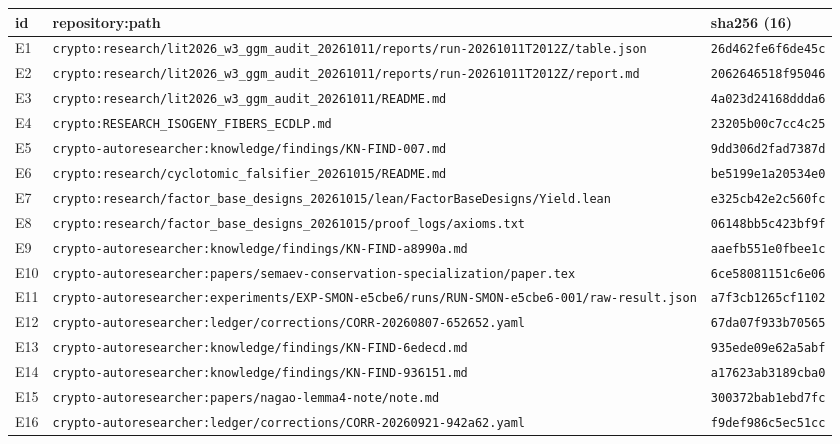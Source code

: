 \begin{longtable}{@{}l p{10.6cm} l@{}}
\toprule
id & repository:path & sha256 (16) \\
\midrule
\endhead
E1 & \nolinkurl{crypto:research/lit2026_w3_ggm_audit_20261011/reports/run-20261011T2012Z/table.json} & \texttt{26d462fe6f6de45c} \\
E2 & \nolinkurl{crypto:research/lit2026_w3_ggm_audit_20261011/reports/run-20261011T2012Z/report.md} & \texttt{2062646518f95046} \\
E3 & \nolinkurl{crypto:research/lit2026_w3_ggm_audit_20261011/README.md} & \texttt{4a023d24168ddda6} \\
E4 & \nolinkurl{crypto:RESEARCH_ISOGENY_FIBERS_ECDLP.md} & \texttt{23205b00c7cc4c25} \\
E5 & \nolinkurl{crypto-autoresearcher:knowledge/findings/KN-FIND-007.md} & \texttt{9dd306d2fad7387d} \\
E6 & \nolinkurl{crypto:research/cyclotomic_falsifier_20261015/README.md} & \texttt{be5199e1a20534e0} \\
E7 & \nolinkurl{crypto:research/factor_base_designs_20261015/lean/FactorBaseDesigns/Yield.lean} & \texttt{e325cb42e2c560fc} \\
E8 & \nolinkurl{crypto:research/factor_base_designs_20261015/proof_logs/axioms.txt} & \texttt{06148bb5c423bf9f} \\
E9 & \nolinkurl{crypto-autoresearcher:knowledge/findings/KN-FIND-a8990a.md} & \texttt{aaefb551e0fbee1c} \\
E10 & \nolinkurl{crypto-autoresearcher:papers/semaev-conservation-specialization/paper.tex} & \texttt{6ce58081151c6e06} \\
E11 & \nolinkurl{crypto-autoresearcher:experiments/EXP-SMON-e5cbe6/runs/RUN-SMON-e5cbe6-001/raw-result.json} & \texttt{a7f3cb1265cf1102} \\
E12 & \nolinkurl{crypto-autoresearcher:ledger/corrections/CORR-20260807-652652.yaml} & \texttt{67da07f933b70565} \\
E13 & \nolinkurl{crypto-autoresearcher:knowledge/findings/KN-FIND-6edecd.md} & \texttt{935ede09e62a5abf} \\
E14 & \nolinkurl{crypto-autoresearcher:knowledge/findings/KN-FIND-936151.md} & \texttt{a17623ab3189cba0} \\
E15 & \nolinkurl{crypto-autoresearcher:papers/nagao-lemma4-note/note.md} & \texttt{300372bab1ebd7fc} \\
E16 & \nolinkurl{crypto-autoresearcher:ledger/corrections/CORR-20260921-942a62.yaml} & \texttt{f9def986c5ec51cc} \\

\end{longtable}
